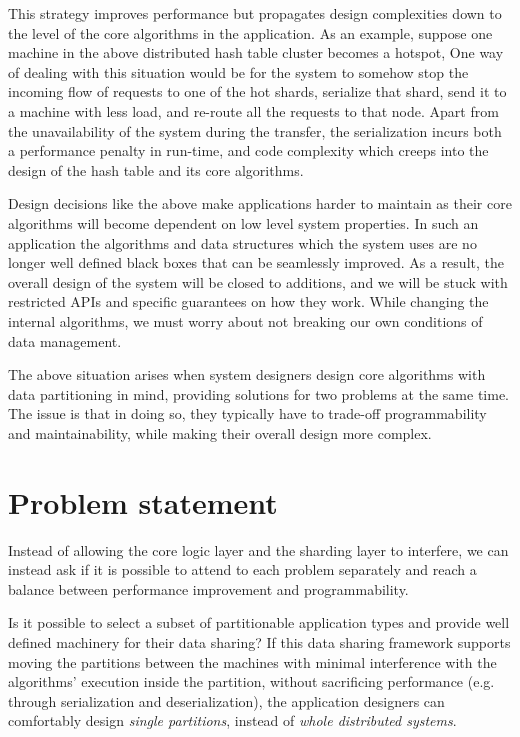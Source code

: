This strategy improves performance but propagates design complexities
down to the level of the core algorithms in the application. As an example, suppose
one machine in the above distributed hash table cluster becomes a hotspot,
One way of dealing with this situation would be for the system to somehow stop
the incoming flow of requests to one of the hot shards, serialize that shard,
send it to a machine with less load, and re-route all the requests to that node.
Apart from the unavailability of the system during the transfer, the
serialization incurs both a performance penalty in run-time, and code complexity
which creeps into the design of the hash table and its core algorithms.

Design decisions like the above make applications harder to maintain as their
core algorithms will become dependent on low level system properties.
In such an application the algorithms and data structures which the system uses
are no longer well defined black boxes that can be seamlessly improved. As a
result, the overall design of the system will be closed to additions, and we
will be stuck with restricted APIs and specific guarantees on how they work.
While changing the internal algorithms, we must worry about not breaking our own
conditions of data management.

The above situation arises when system designers design
core algorithms with data partitioning in mind, providing solutions for two
problems at the same time. The issue is that in doing so, they typically have to
trade-off programmability and maintainability, while making their overall design
more complex.

\section{Problem statement}
Instead of allowing the core logic layer and the sharding layer to interfere,
we can instead ask if it is possible to attend to each problem separately and
reach a balance between performance improvement and programmability.

Is it possible to select a subset of partitionable application types
and provide well defined machinery for their data sharing? If this data sharing
framework supports moving the partitions between the machines with minimal
interference with the algorithms' execution inside the partition, without
sacrificing performance (e.g. through serialization and deserialization), the
application designers can comfortably design \emph{single partitions}, instead
of \emph{whole distributed systems}.

